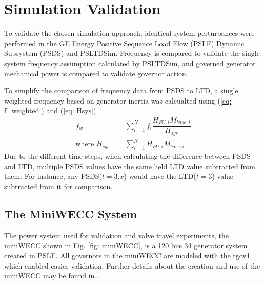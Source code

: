 \section{Simulation Validation}
To validate the chosen simulation approach, identical system perturbances were performed in the GE Energy Positive Sequence Load Flow (PSLF) Dynamic Subsystem (PSDS) and PSLTDSim.
Frequency is compared to validate the single system frequency assumption calculated by PSLTDSim, and governed generator mechanical power is compared to validate governor action.

To simplify the comparison of frequency data from PSDS to LTD, a single weighted frequency based on generator inertia was calcualted using (\ref{eq: f_weighted}) and (\ref{eq: Hsys}).
\begin{align}
f_{w} &= \sum_{i=1}^{N} f_i \dfrac{H_{PU, i} M_{base, i} }{H_{sys}}  \label{eq: f_weighted}\\
\text{where } H_{sys} &= \sum_{i=1}^{N} H_{PU, i} M_{base, i}  \label{eq: Hsys}
\end{align}%
Due to the different time steps, when calculating the difference between PSDS and LTD, multiple PSDS values have the same held LTD value subtracted from them. 
For instance, any PSDS($t = 3.x$) would have the LTD($t = 3$) value subtracted from it for comparison.


\subsection{The MiniWECC System}

The power system used for validation and valve travel experiments, the miniWECC shown in Fig. \ref{fig: miniWECC}, is a 120 bus 34 generator system created in PSLF.
All governors in the miniWECC are modeled with the tgov1 which enabled easier validation.
Further details about the creation and use of the miniWECC may be found in \cite{trudnowski2012, sandia2015, RJminiWECC}.

